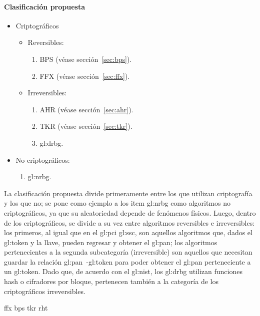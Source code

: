 \paragraph{Clasificación propuesta}
\begin{itemize}
  \item{Criptográficos}
    \begin{itemize}
      \item Reversibles:
        \begin{enumerate}
          \item BPS (véase sección~\ref{sec:bps}).
          \item FFX (véase sección~\ref{sec:ffx}).
        \end{enumerate}
      \item Irreversibles:
        \begin{enumerate}
          \item AHR (véase sección~\ref{sec:ahr}).
          \item TKR (véase sección~\ref{sec:tkr}).
          \item \gls{gl:drbg}.
        \end{enumerate}
    \end{itemize}
  \item No criptográficos:
    \begin{enumerate}
      \item \gls{gl:nrbg}.
    \end{enumerate}
\end{itemize}

La clasificación propuesta divide primeramente entre los que utilizan
criptografía y los que no; se pone como ejemplo a los item \gls{gl:nrbg} como
algoritmos no criptográficos, ya que su aleatoriedad depende de fenómenos físicos.
Luego, dentro de los criptográficos, se divide a su vez entre algoritmos
reversibles e irreversibles: los primeros, al igual que en el
\gls{gl:pci} \gls{gl:ssc}, son aquellos algoritmos que, dados el \gls{gl:token}
y la llave, pueden regresar y obtener el \gls{gl:pan}; los algoritmos
pertenecientes a la segunda subcategoría (irreversible) son aquellos que
necesitan guardar la relación \gls{gl:pan}~-\gls{gl:token} para poder obtener
el \gls{gl:pan} perteneciente a un \gls{gl:token}. Dado que, de acuerdo con el
\gls{gl:nist}, los \gls{gl:drbg} utilizan funciones hash o cifradores por
bloque, pertenecen también a la categoría de los criptográficos irreversibles.

{ffx}
{bps}
{tkr}
{rht}
